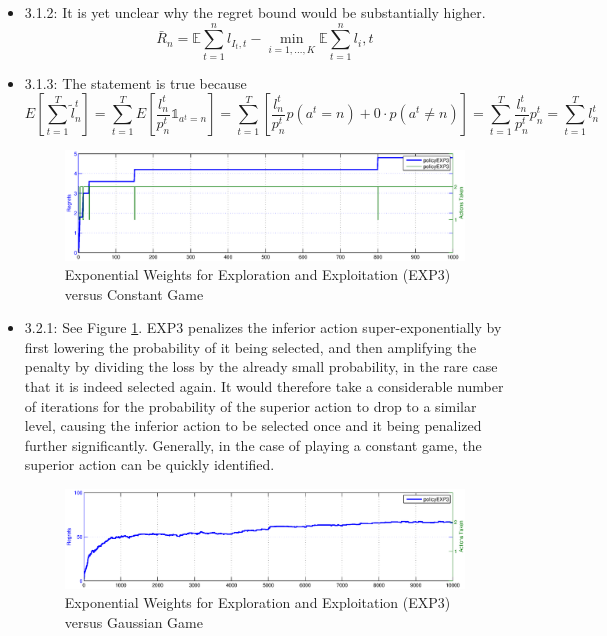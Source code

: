 \documentclass{article}
\begin{document}
\begin{itemize}
	\item 3.1.2: It is yet unclear why the regret bound would be substantially higher. 
	\begin{equation}
		\bar{R}_n=\mathbb{E}\sum_{t=1}^nl_{I_t,t}-\min_{i=1,\dots,K}\mathbb{E}\sum_{t=1}^nl_i,t
	\end{equation}
		
	\item 3.1.3: The statement is true because 
	\begin{equation}
		E\left[\sum_{t=1}^T\tilde{l}_n^t\right]=\sum_{t=1}^T
		E\left[\frac{l_n^t}{p_n^t}\mathds{1}_{a^t=n}\right]=\sum_{t=1}^T
		\left[\frac{l_n^t}{p_n^t}p(a^t=n)+0\cdot p(a^t\ne n)\right]=\sum_{t=1}^T
		\frac{l_n^t}{p_n^t}p_n^t=\sum_{t=1}^Tl_n^t
	\end{equation}
	
	\begin{figure}[t!]
		\centering
		\includegraphics[width = \textwidth]{images/plot321.eps}
		\caption{Exponential Weights for Exploration and Exploitation (EXP3) versus Constant Game}
		\label{plot321}
	\end{figure}		
	
	\item 3.2.1:	See Figure \ref{plot321}. EXP3 penalizes the inferior action
		super-exponentially by first lowering the probability of it being selected, 
		and then amplifying the penalty by dividing the loss by the already small 
		probability, in the rare case that it is indeed selected again. It would
		therefore take a considerable number of iterations for the probability of
		the superior action to drop to a similar level, causing the inferior action
		to be selected once and it being penalized further significantly. Generally,
		in the case of playing a constant game, the superior action can be quickly identified. 
		
	\begin{figure}[t!]
		\centering
		\includegraphics[width = \textwidth]{images/plot332.eps}
		\caption{Exponential Weights for Exploration and Exploitation (EXP3) versus Gaussian Game}
		\label{plot332}
	\end{figure}		
		

\end{itemize}
\end{document}
